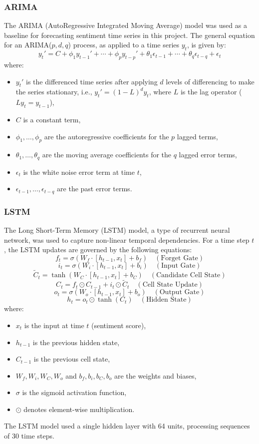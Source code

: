 \documentclass[letterpaper]{article}
\begin{document}
\subsubsection{ARIMA} The ARIMA (AutoRegressive Integrated Moving Average) model was used as a baseline for forecasting sentiment time series in this project. The general equation for an ARIMA(\(p,d,q\)) process, as applied to a time series \(y_t\), is given by:
\[
y_t' = C + \phi_1 y_{t-1}' + \cdots + \phi_p y_{t-p}' + \theta_1 \epsilon_{t-1} + \cdots + \theta_q \epsilon_{t-q} + \epsilon_t
\]
where:
\begin{itemize}
    \item \(y_t'\) is the differenced time series after applying \(d\) levels of differencing to make the series stationary, i.e., \(y_t' = (1 - L)^d y_t\), where \(L\) is the lag operator (\(L y_t = y_{t-1}\)),
    \item \(C\) is a constant term,
    \item \(\phi_1, \ldots, \phi_p\) are the autoregressive coefficients for the \(p\) lagged terms,
    \item \(\theta_1, \ldots, \theta_q\) are the moving average coefficients for the \(q\) lagged error terms,
    \item \(\epsilon_t\) is the white noise error term at time \(t\),
    \item \(\epsilon_{t-1}, \ldots, \epsilon_{t-q}\) are the past error terms.
\end{itemize}

\subsubsection{LSTM}
The Long Short-Term Memory (LSTM) model, a type of recurrent neural network, was used to capture non-linear temporal dependencies. For a time step $t$, the LSTM updates are governed by the following equations:
\[
f_t = \sigma(W_f \cdot [h_{t-1}, x_t] + b_f) \quad (\text{Forget Gate})
\]
\[
i_t = \sigma(W_i \cdot [h_{t-1}, x_t] + b_i) \quad (\text{Input Gate})
\]
\[
\tilde{C}_t = \tanh(W_C \cdot [h_{t-1}, x_t] + b_C) \quad (\text{Candidate Cell State})
\]
\[
C_t = f_t \odot C_{t-1} + i_t \odot \tilde{C}_t \quad (\text{Cell State Update})
\]
\[
o_t = \sigma(W_o \cdot [h_{t-1}, x_t] + b_o) \quad (\text{Output Gate})
\]
\[
h_t = o_t \odot \tanh(C_t) \quad (\text{Hidden State})
\]
where:
\begin{itemize}
    \item $x_t$ is the input at time $t$ (sentiment score),
    \item $h_{t-1}$ is the previous hidden state,
    \item $C_{t-1}$ is the previous cell state,
    \item $W_f, W_i, W_C, W_o$ and $b_f, b_i, b_C, b_o$ are the weights and biases,
    \item $\sigma$ is the sigmoid activation function,
    \item $\odot$ denotes element-wise multiplication.
\end{itemize}
The LSTM model used a single hidden layer with 64 units, processing sequences of 30 time steps.
\end{document}
